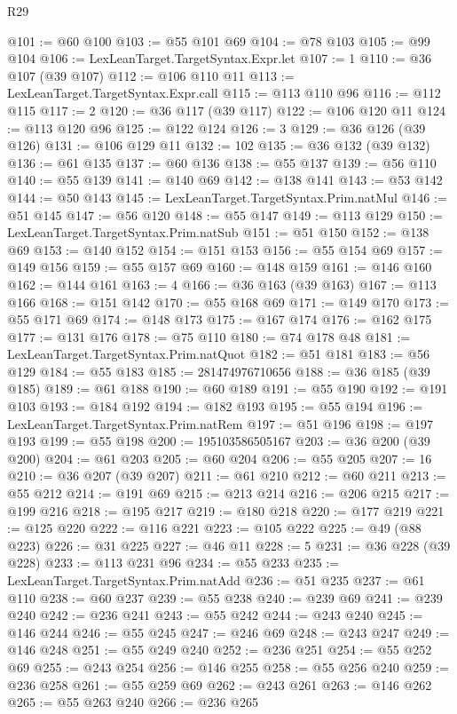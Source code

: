 \begin{lexlean}{R29}
\begin{coremodule}
@101 := @60 @100
@103 := @55 @101 @69
@104 := @78 @103
@105 := @99 @104
@106 := LexLeanTarget.TargetSyntax.Expr.let
@107 := 1
@110 := @36 @107 (@39 @107)
@112 := @106 @110 @11
@113 := LexLeanTarget.TargetSyntax.Expr.call
@115 := @113 @110 @96
@116 := @112 @115
@117 := 2
@120 := @36 @117 (@39 @117)
@122 := @106 @120 @11
@124 := @113 @120 @96
@125 := @122 @124
@126 := 3
@129 := @36 @126 (@39 @126)
@131 := @106 @129 @11
@132 := 102
@135 := @36 @132 (@39 @132)
@136 := @61 @135
@137 := @60 @136
@138 := @55 @137
@139 := @56 @110
@140 := @55 @139
@141 := @140 @69
@142 := @138 @141
@143 := @53 @142
@144 := @50 @143
@145 := LexLeanTarget.TargetSyntax.Prim.natMul
@146 := @51 @145
@147 := @56 @120
@148 := @55 @147
@149 := @113 @129
@150 := LexLeanTarget.TargetSyntax.Prim.natSub
@151 := @51 @150
@152 := @138 @69
@153 := @140 @152
@154 := @151 @153
@156 := @55 @154 @69
@157 := @149 @156
@159 := @55 @157 @69
@160 := @148 @159
@161 := @146 @160
@162 := @144 @161
@163 := 4
@166 := @36 @163 (@39 @163)
@167 := @113 @166
@168 := @151 @142
@170 := @55 @168 @69
@171 := @149 @170
@173 := @55 @171 @69
@174 := @148 @173
@175 := @167 @174
@176 := @162 @175
@177 := @131 @176
@178 := @75 @110
@180 := @74 @178 @48
@181 := LexLeanTarget.TargetSyntax.Prim.natQuot
@182 := @51 @181
@183 := @56 @129
@184 := @55 @183
@185 := 281474976710656
@188 := @36 @185 (@39 @185)
@189 := @61 @188
@190 := @60 @189
@191 := @55 @190
@192 := @191 @103
@193 := @184 @192
@194 := @182 @193
@195 := @55 @194
@196 := LexLeanTarget.TargetSyntax.Prim.natRem
@197 := @51 @196
@198 := @197 @193
@199 := @55 @198
@200 := 195103586505167
@203 := @36 @200 (@39 @200)
@204 := @61 @203
@205 := @60 @204
@206 := @55 @205
@207 := 16
@210 := @36 @207 (@39 @207)
@211 := @61 @210
@212 := @60 @211
@213 := @55 @212
@214 := @191 @69
@215 := @213 @214
@216 := @206 @215
@217 := @199 @216
@218 := @195 @217
@219 := @180 @218
@220 := @177 @219
@221 := @125 @220
@222 := @116 @221
@223 := @105 @222
@225 := @49 (@88 @223)
@226 := @31 @225
@227 := @46 @11
@228 := 5
@231 := @36 @228 (@39 @228)
@233 := @113 @231 @96
@234 := @55 @233
@235 := LexLeanTarget.TargetSyntax.Prim.natAdd
@236 := @51 @235
@237 := @61 @110
@238 := @60 @237
@239 := @55 @238
@240 := @239 @69
@241 := @239 @240
@242 := @236 @241
@243 := @55 @242
@244 := @243 @240
@245 := @146 @244
@246 := @55 @245
@247 := @246 @69
@248 := @243 @247
@249 := @146 @248
@251 := @55 @249 @240
@252 := @236 @251
@254 := @55 @252 @69
@255 := @243 @254
@256 := @146 @255
@258 := @55 @256 @240
@259 := @236 @258
@261 := @55 @259 @69
@262 := @243 @261
@263 := @146 @262
@265 := @55 @263 @240
@266 := @236 @265

\end{coremodule}
\end{lexlean}
